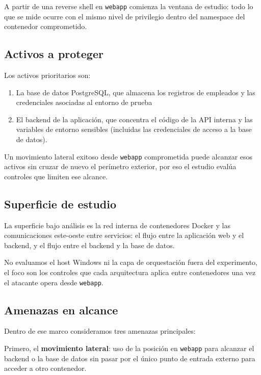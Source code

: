 \documentclass[11pt,spanish,listoffigures,listoftables]{tfgetsinf}
\begin{document}
        A partir de una reverse shell en \texttt{webapp} comienza la ventana de estudio: todo lo que se mide ocurre con el mismo nivel de privilegio dentro del namespace del contenedor comprometido.

        \subsection{Activos a proteger}
        \label{sec:3.2.2}
        Los activos prioritarios son: 
            \begin{enumerate}
                \item La base de datos PostgreSQL, que almacena los registros de empleados y las credenciales asociadas al entorno de prueba
                \item El backend de la aplicación, que concentra el código de la API interna y las variables de entorno sensibles (incluidas las credenciales de acceso a la base de datos).
            \end{enumerate}
            Un movimiento lateral exitoso desde \texttt{webapp} comprometida puede alcanzar esos activos sin cruzar de nuevo el perímetro exterior, por eso el estudio evalúa controles que limiten ese alcance.
            
        \subsection{Superficie de estudio}
        \label{sec:3.2.3}
        La superficie bajo análisis es la red interna de contenedores Docker y las comunicaciones este-oeste entre servicios: el flujo entre la aplicación web y el backend, y el flujo entre el backend y la base de datos. 

        No evaluamos el host Windows ni la capa de orquestación fuera del experimento, el foco son los controles que cada arquitectura aplica entre contenedores una vez el atacante opera desde \texttt{webapp}.
        
        \subsection{Amenazas en alcance}
        \label{sec:3.2.4}
        Dentro de ese marco consideramos tres amenazas principales:

        Primero, el \textbf{movimiento lateral}: uso de la posición en \texttt{webapp} para alcanzar el backend o la base de datos sin pasar por el único punto de entrada externo para acceder a otro contenedor.
        
\end{document}

